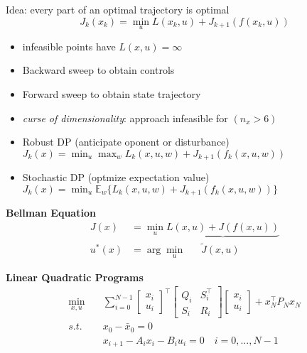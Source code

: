 
\begin{tcolorbox}[colback=yellow!5!white,colframe=yellow!75!black,title=\textbf{Dynamic Programming}]
	Idea: every part of an optimal trajectory is optimal
	\begin{equation*}
	J_k(x_k) = \min_u L(x_k, u) + J_{k+1}(f(x_k, u))
	\end{equation*}
	\begin{itemize}
		\item infeasible points have $L(x,u) = \infty$
		\item Backward sweep to obtain controls
		\item Forward sweep to obtain state trajectory
		\item \textit{curse of dimensionality}: approach infeasible for $(n_x>6)$
		\item Robust DP (anticipate oponent or disturbance)\\
		$J_k(x) = \min_u \max_w L_k(x,u,w) + J_{k+1}(f_k(x,u,w))$
		\item Stochastic DP (optmize expectation value)\\
		$J_k(x) = \min_u \mathbb{E}_w\{ L_k(x,u,w) + J_{k+1}(f_k(x,u,w)) \}$\\
	\end{itemize}

	\textbf{Bellman Equation}
	\begin{align*}
		J(x) &= \min_u \underbrace{L(x,u) + J(f(x, u))}\\
		u^*(x) &= \arg \min_u \quad \;\; \tilde{J}(x, u)
	\end{align*}
	
	
	\textbf{Linear Quadratic Programs}
	\begin{align*}
		\min_{x,u}\quad&
		\sum_{i=0}^{N-1}
		\begin{bmatrix}
			x_i\\ u_i
		\end{bmatrix}^\top
		\begin{bmatrix}
			Q_i & S_i^\top\\ S_i & R_i
		\end{bmatrix}
	\begin{bmatrix}
		x_i\\ u_i
	\end{bmatrix}
	+
	x_N^\top P_N x_N\\
	s.t.\quad&
	x_0 - \bar{x}_0 = 0\\
	&x_{i+1} - A_i x_i - B_i u_i = 0 \quad i = 0, ..., N-1
	\end{align*}


\end{tcolorbox}

